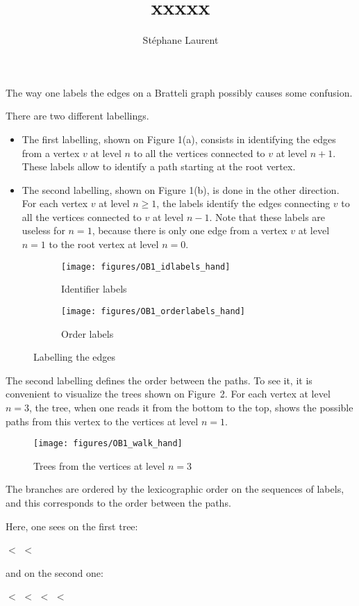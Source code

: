 \documentclass[12pt,a4paper]{article}
\author{Stéphane Laurent}
\title{xxxxx}
\begin{document}
The way one labels the edges on a Bratteli graph possibly causes some confusion.

There are two different labellings. 

\begin{itemize}
\item The first labelling, shown on Figure 1(a), consists in identifying 
the edges from a vertex $v$ at level $n$ to all the vertices connected to $v$ at 
level $n+1$. These labels allow to identify a path starting at the root vertex. 

\item The second labelling, shown on Figure 1(b), is done in the other direction. 
For each vertex $v$ at level $n\geq 1$, the labels identify the edges connecting $v$ 
to all the vertices connected to $v$ at level $n-1$. 
Note that these labels are useless for $n=1$, because there is only one edge from 
a vertex $v$ at level $n=1$ to the root vertex at level $n=0$. 
\end{itemize}




\begin{figure}[!h]
   \centering
   \begin{subfigure}[t]{0.47\textwidth}
   \centering
   	\texttt{[image: figures/OB1\_idlabels\_hand]}
 		\caption{\footnotesize Identifier labels}\label{fig:labels_id}
    \end{subfigure}              
   \quad
    \begin{subfigure}[t]{0.47\textwidth}
    \centering
   	\texttt{[image: figures/OB1\_orderlabels\_hand]}
 		\caption{\footnotesize Order labels}\label{fig:labels_order}
 	\end{subfigure}      

   \caption{Labelling the edges}
   \label{fig:labels}
 \end{figure}
 
The second labelling defines the order between the paths. To see it, it is convenient to visualize the trees shown on Figure~2. For each vertex at level $n=3$, the tree, when one reads it from the bottom to the top, shows the possible paths from this vertex to the vertices at level $n=1$. 
 
 \begin{figure}[!h]
   \centering
   	\texttt{[image: figures/OB1\_walk\_hand]}
   \caption{Trees from the vertices at level $n=3$}
   \label{fig:tree}
 \end{figure}

The branches are ordered by the lexicographic order on the sequences of labels, and this corresponds to the order between the paths. 

Here, one sees on the first tree: 
\begin{center}
  $<$  $<$  
\end{center}
and on the second one: 
\begin{center}
 $<$  $<$  $<$  $<$ 
\end{center}
\end{document}
